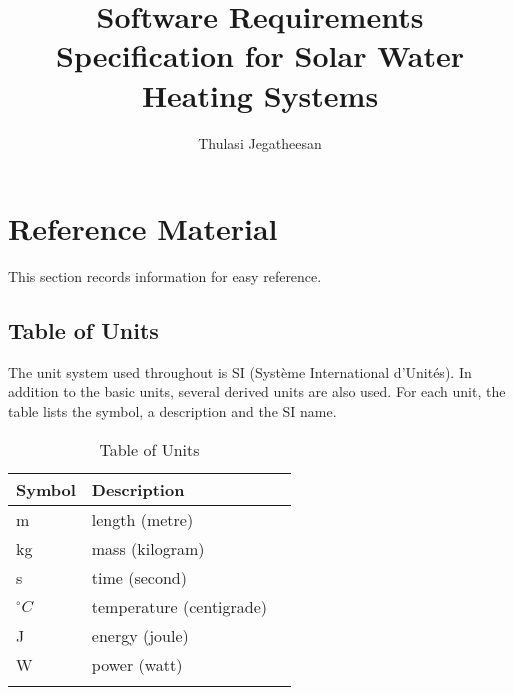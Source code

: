 \documentclass[12pt]{article}
\title{Software Requirements Specification for Solar Water Heating Systems}
\author{Thulasi Jegatheesan}
\begin{document}
\maketitle
\tableofcontents
\newpage
\section{Reference Material}
\label{Sec:RM}
This section records information for easy reference.
\subsection{Table of Units}
\label{Sec:ToU}
The unit system used throughout is SI (Syst\`{e}me International d'Unit\'{e}s). In addition to the basic units, several derived units are also used. For each unit, the table lists the symbol, a description and the SI name.
\begin{longtable}{l l l}
\toprule
Symbol & Description
\\
\midrule
m & length (metre)
\\
kg & mass (kilogram)
\\
s & time (second)
\\
${}^{\circ}C$ & temperature (centigrade)
\\
J & energy (joule)
\\
W & power (watt)
\\
\bottomrule
\caption{Table of Units}
\label{Table:ToU}
\end{longtable}
\end{document}
